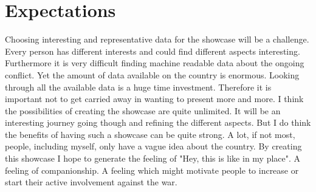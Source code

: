 \documentclass[
a4paper,     %
12pt         %
]{scrartcl}  %
\begin{document}
\section{Expectations}
Choosing interesting and representative data for the showcase will be a challenge. Every person has different interests and could find different aspects interesting. Furthermore it is very difficult finding machine readable data about the ongoing conflict. Yet the amount of data available on the country is enormous. Looking through all the available data is a huge time investment. Therefore it is important not to get carried away in wanting to present more and more.
I think the possibilities of creating the showcase are quite unlimited. It will be an interesting journey going though and refining the different aspects. But I do think the benefits of having such a showcase can be quite strong. A lot, if not most, people, including myself, only have a vague idea about the country. By creating this showcase I hope to generate the feeling of "Hey, this is like in my place". A feeling of companionship. A feeling which might motivate people to increase or start their active involvement against the war.




% 

% 
\end{document}
